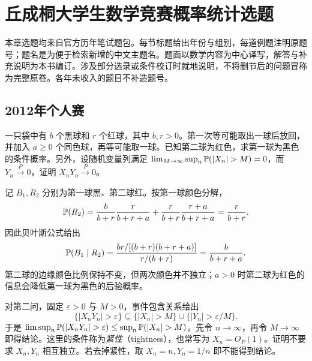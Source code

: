 \setcounter{chapter}{1} %
\chapter{丘成桐大学生数学竞赛概率统计选题}
本章选题均来自官方历年笔试题包。每节标题给出年份与组别，每道例题注明原题号；题名是为便于检索新增的中文主题名。题面以数学内容为中心译写，解答与补充说明为本书编订。涉及部分选录或条件校订时就地说明，不将删节后的问题冒称为完整原卷。各年未收入的题目不补造题号。

\section{2012年个人赛}
\begin{example}[原题1：强化抽样与随机乘积]\label{yau:2012-1}
一只袋中有 $b$ 个黑球和 $r$ 个红球，其中 $b,r>0$。第一次等可能取出一球后放回，并加入 $a\ge0$ 个同色球，再等可能取一球。已知第二球为红色，求第一球为黑色的条件概率。另外，设随机变量列满足 $\lim_{M\to\infty}\sup_n\PP(|X_n|>M)=0$，而 $Y_n\xrightarrow{P}0$，证明 $X_nY_n\xrightarrow{P}0$。
\end{example}
\begin{solve}
记 $B_1,R_2$ 分别为第一球黑、第二球红。按第一球颜色分解，
\[
\mathbb P(R_2)=\frac b{b+r}\frac r{b+r+a}+\frac r{b+r}\frac{r+a}{b+r+a}=\frac r{b+r}.
\]
因此贝叶斯公式给出
\[
\mathbb P(B_1\mid R_2)=\frac{br/[(b+r)(b+r+a)]}{r/(b+r)}=\frac b{b+r+a}.
\]
第二球的边缘颜色比例保持不变，但两次颜色并不独立；$a>0$ 时第二球为红色的信息会降低第一球为黑色的后验概率。

对第二问，固定 $\varepsilon>0$ 与 $M>0$，事件包含关系给出
\[
\{|X_nY_n|>\varepsilon\}\subseteq\{|X_n|>M\}\cup\{|Y_n|>\varepsilon/M\}.
\]
于是 $\limsup_n\PP(|X_nY_n|>\varepsilon)\le\sup_n\PP(|X_n|>M)$。先令 $n\to\infty$，再令 $M\to\infty$ 即得结论。这里的条件称为\emph{紧性}（tightness），也常写为 $X_n=O_P(1)$。证明不要求 $X_n,Y_n$ 相互独立。若去掉紧性，取 $X_n=n,Y_n=1/n$ 即不能得到结论。
\end{solve}

